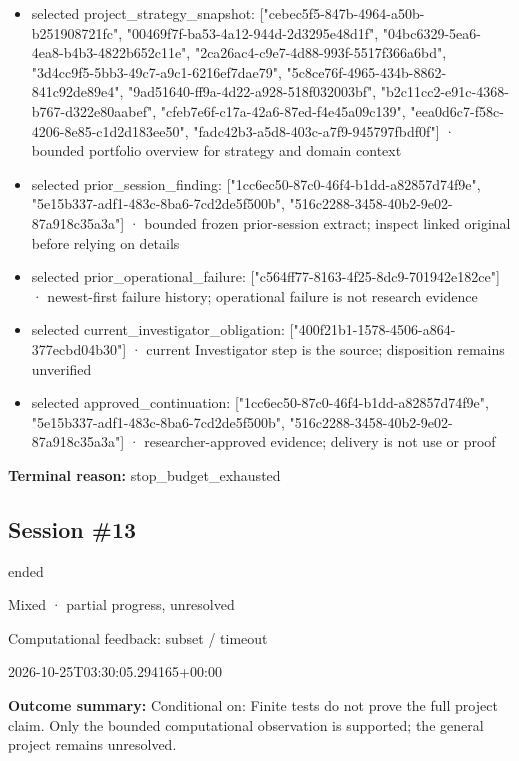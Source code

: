 \documentclass[11pt]{article}
\begin{document}
\begin{itemize}
\item selected project\_strategy\_snapshot: ["cebec5f5-847b-4964-a50b-b251908721fc", "00469f7f-ba53-4a12-944d-2d3295e48d1f", "04bc6329-5ea6-4ea8-b4b3-4822b652c11e", "2ca26ac4-c9e7-4d88-993f-5517f366a6bd", "3d4cc9f5-5bb3-49c7-a9c1-6216ef7dae79", "5c8ce76f-4965-434b-8862-841c92de89e4", "9ad51640-ff9a-4d22-a928-518f032003bf", "b2c11cc2-e91c-4368-b767-d322e80aabef", "cfeb7e6f-c17a-42a6-87ed-f4e45a09c139", "eea0d6c7-f58c-4206-8e85-c1d2d183ee50", "fadc42b3-a5d8-403c-a7f9-945797fbdf0f"] · bounded portfolio overview for strategy and domain context
\item selected prior\_session\_finding: ["1cc6ec50-87c0-46f4-b1dd-a82857d74f9e", "5e15b337-adf1-483c-8ba6-7cd2de5f500b", "516c2288-3458-40b2-9e02-87a918c35a3a"] · bounded frozen prior-session extract; inspect linked original before relying on details
\item selected prior\_operational\_failure: ["c564ff77-8163-4f25-8dc9-701942e182ce"] · newest-first failure history; operational failure is not research evidence
\item selected current\_investigator\_obligation: ["400f21b1-1578-4506-a864-377ecbd04b30"] · current Investigator step is the source; disposition remains unverified
\item selected approved\_continuation: ["1cc6ec50-87c0-46f4-b1dd-a82857d74f9e", "5e15b337-adf1-483c-8ba6-7cd2de5f500b", "516c2288-3458-40b2-9e02-87a918c35a3a"] · researcher-approved evidence; delivery is not use or proof
\end{itemize}
\textbf{Terminal reason:} stop\_budget\_exhausted\par
\subsection{Session \#13}
\begin{description}[style=nextline,font=\normalfont\bfseries,leftmargin=0pt,labelsep=0pt]
\item[Execution status] ended
\item[Outcome] Mixed · partial progress, unresolved
\item[Strategy] Computational feedback: subset / timeout
\item[Started] 2026-10-25T03:30:05.294165+00:00
\end{description}
\textbf{Outcome summary:} Conditional on: Finite tests do not prove the full project claim. Only the bounded computational observation is supported; the general project remains unresolved.\par
\end{document}

